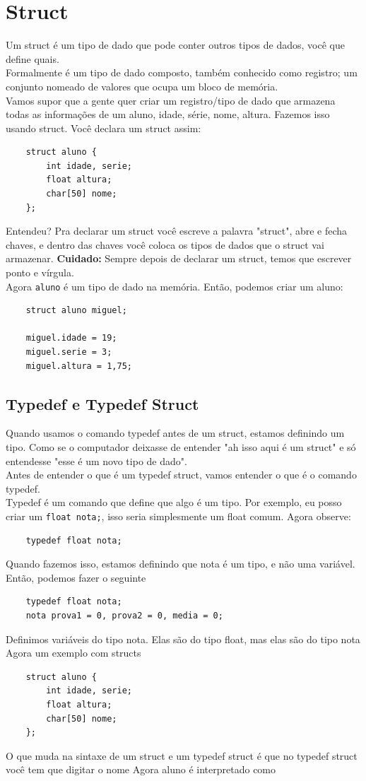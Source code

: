 \documentclass{article}
\begin{document}
\section{Struct}
Um struct é um tipo de dado que pode conter outros tipos de dados, você que define quais.
\\[3pt]
Formalmente é um tipo de dado composto, também conhecido como registro; um conjunto nomeado de valores que ocupa um bloco de memória.
\\[3pt]
Vamos supor que a gente quer criar um registro/tipo de dado que armazena todas as informações de um aluno, idade, série, nome, altura. Fazemos isso usando struct. Você declara um struct assim:
\begin{lstlisting}
    struct aluno {
        int idade, serie;
        float altura;
        char[50] nome;
    };
\end{lstlisting}
Entendeu? Pra declarar um struct você escreve a palavra "struct", abre e fecha chaves, e dentro das chaves você coloca os tipos de dados que o struct vai armazenar. \textbf{Cuidado: } Sempre depois de declarar um struct, temos que escrever ponto e vírgula. 
\\[3pt]
Agora \texttt{aluno} é um tipo de dado na memória. Então, podemos criar um aluno:
\begin{lstlisting}
    struct aluno miguel;

    miguel.idade = 19;
    miguel.serie = 3;
    miguel.altura = 1,75;
\end{lstlisting}

\subsection{Typedef e Typedef Struct}
Quando usamos o comando typedef antes de um struct, estamos definindo um tipo. Como se o computador deixasse de entender "ah isso aqui é um struct" e só entendesse "esse é um novo tipo de dado".
\\[3pt]
Antes de entender o que é um typedef struct, vamos entender o que é o comando typedef.
\\[3pt]
Typedef é um comando que define que algo é um tipo. Por exemplo, eu posso criar um \texttt{float nota;}, isso seria simplesmente um float comum. Agora observe:
\begin{lstlisting}
    typedef float nota;
\end{lstlisting}
Quando fazemos isso, estamos definindo que nota é um tipo, e não uma variável. Então, podemos fazer o seguinte
\begin{lstlisting}
    typedef float nota;
    nota prova1 = 0, prova2 = 0, media = 0;
\end{lstlisting}
Definimos variáveis do tipo nota. Elas são do tipo float, mas elas são do tipo nota
\\[3pt]
Agora um exemplo com structs
\begin{lstlisting}
    struct aluno {
        int idade, serie;
        float altura;
        char[50] nome;
    };
\end{lstlisting}
O que muda na sintaxe de um struct e um typedef struct é que no typedef struct você tem que digitar o nome Agora aluno é interpretado como 
\end{document}
